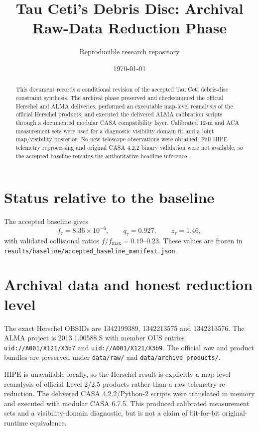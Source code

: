 \documentclass[11pt]{article}
\title{Tau Ceti's Debris Disc: Archival Raw-Data Reduction Phase}
\author{Reproducible research repository}
\date{\today}
\begin{document}
\maketitle

\begin{abstract}
This document records a conditional revision of the accepted Tau Ceti debris-disc
constraint synthesis. The archival phase preserved and checksummed the official
Herschel and ALMA deliveries, performed an executable map-level reanalysis of
the official Herschel products, and executed the delivered ALMA calibration
scripts through a documented modular CASA compatibility layer. Calibrated 12-m
and ACA measurement sets were used for a diagnostic visibility-domain fit and a
joint map/visibility posterior. No new telescope observations were obtained.
Full HIPE telemetry reprocessing and original CASA 4.2.2 binary validation were
not available, so the accepted baseline remains the authoritative headline
inference.
\end{abstract}

\section{Status relative to the baseline}

The accepted baseline gives
\[
f_\tau=8.36\times10^{-6},\qquad
q_\tau=0.927,\qquad
z_\tau=1.46,
\]
with validated collisional ratios \(f/f_{\max}=0.19\)--\(0.23\).
These values are frozen in
\texttt{results/baseline/accepted\_baseline\_manifest.json}.

\section{Archival data and honest reduction level}

The exact Herschel OBSIDs are 1342199389, 1342213575 and 1342213576.
The ALMA project is 2013.1.00588.S with member OUS entries
\texttt{uid://A001/X121/X3b7} and \texttt{uid://A001/X121/X3b9}.
The official raw and product bundles are preserved under
\texttt{data/raw/} and \texttt{data/archive\_products/}.

HIPE is unavailable locally, so the Herschel result is explicitly a map-level
reanalysis of official Level 2/2.5 products rather than a raw telemetry
re-reduction. The delivered CASA 4.2.2/Python-2 scripts were translated in
memory and executed with modular CASA 6.7.5. This produced calibrated
measurement sets and a visibility-domain diagnostic, but is not a claim of
bit-for-bit original-runtime equivalence.
\end{document}
